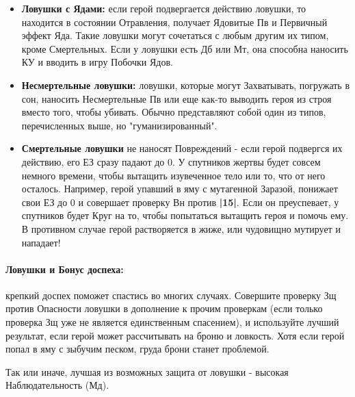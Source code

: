 \begin{itemize}
  \item \textbf{Ловушки с Ядами:} если герой подвергается действию ловушки, то находится в состоянии Отравления, получает Ядовитые Пв и Первичный эффект Яда.
    \newline Такие ловушки могут сочетаться с любым другим их типом, кроме Смертельных. Если у ловушки есть Дб или Мт, она способна наносить КУ и вводить в игру Побочки Ядов.
  \item \textbf{Несмертельные ловушки:} ловушки, которые могут Захватывать, погружать в сон, наносить Несмертельные Пв или еще как-то выводить героя из строя вместо того, чтобы убивать. Обычно представляют собой один из типов, перечисленных выше, но "гуманизированный".
  \item \textbf{Смертельные ловушки} не наносят Повреждений - если герой подвергся их действию, его ЕЗ сразу падают до 0. У спутников жертвы будет совсем немного времени, чтобы вытащить изувеченное тело или то, что от него осталось.
    \newline Например, герой упавший в яму с мутагенной Заразой, понижает свои ЕЗ до 0 и совершает проверку Вн против \textbf{|15|}. Если он преуспевает, у спутников будет Круг на то, чтобы попытаться вытащить героя и помочь ему. В противном случае герой растворяется в жиже, или чудовищно мутирует и нападает!
\end{itemize}
\paragraph{Ловушки и Бонус доспеха:} крепкий доспех поможет спастись во многих случаях. Совершите проверку Зщ против Опасности ловушки в дополнение к прочим проверкам (если только проверка Зщ уже не является единственным спасением), и используйте лучший результат, если герой может рассчитывать на броню и ловкость. Хотя если герой попал в яму с зыбучим песком, груда брони станет проблемой. 
\begin{tcolorbox}
  Так или иначе, лучшая из возможных защита от ловушки - высокая Наблюдательность (Мд).
\end{tcolorbox}
